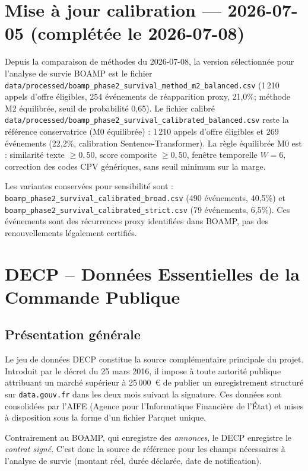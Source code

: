 \documentclass[12pt,a4paper]{article}
\begin{document}
\section*{Mise à jour calibration --- 2026-07-05 (complétée le 2026-07-08)}

Depuis la comparaison de méthodes du 2026-07-08, la version sélectionnée pour
l'analyse de survie BOAMP est le fichier
\texttt{data/processed/boamp\_phase2\_survival\_method\_m2\_balanced.csv}
(1\,210 appels d'offre éligibles, 254 événements de réapparition proxy,
21,0\%; méthode M2 équilibrée, seuil de probabilité 0,65). Le fichier calibré
\texttt{data/processed/boamp\_phase2\_survival\_calibrated\_balanced.csv}
reste la référence conservatrice (M0 équilibrée) : 1\,210 appels d'offre
éligibles et 269 événements (22,2\%, calibration Sentence-Transformer). La
règle équilibrée M0 est : similarité texte $\geq 0{,}50$, score composite
$\geq 0{,}50$, fenêtre temporelle $W=6$, correction des codes CPV génériques,
sans seuil minimum sur la marge.

Les variantes conservées pour sensibilité sont :
\texttt{boamp\_phase2\_survival\_calibrated\_broad.csv} (490 événements,
40,5\%) et \texttt{boamp\_phase2\_survival\_calibrated\_strict.csv}
(79 événements, 6,5\%). Ces événements sont des récurrences proxy identifiées
dans BOAMP, pas des renouvellements légalement certifiés.

\section{DECP -- Données Essentielles de la Commande Publique}

\subsection{Présentation générale}

Le jeu de données DECP constitue la source complémentaire principale du projet.
Introduit par le décret du 25 mars 2016, il impose à toute autorité publique
attribuant un marché supérieur à 25\,000~€ de publier un enregistrement
structuré sur \texttt{data.gouv.fr} dans les deux mois suivant la signature.
Ces données sont consolidées par l'AIFE (Agence pour l'Informatique Financière
de l'État) et mises à disposition sous la forme d'un fichier Parquet unique.

Contrairement au BOAMP, qui enregistre des \emph{annonces}, le DECP enregistre
le \emph{contrat signé}. C'est donc la source de référence pour les champs
nécessaires à l'analyse de survie (montant réel, durée déclarée, date de
notification).
\end{document}
